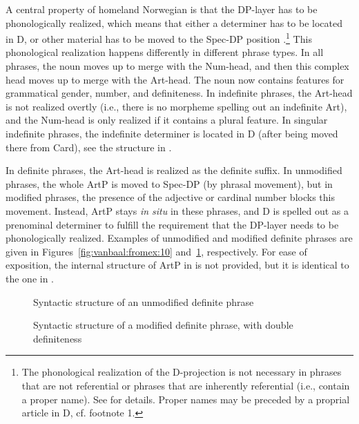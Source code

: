 \documentclass[output=paper]{langscibook}
\begin{document}
A central property of homeland Norwegian is that the DP-layer has to be phonologically realized, which means that either a determiner has to be located in D, or other material has to be moved to the Spec-DP position \citep{Julien2002Determiners,Julien2005}.{\footnote{The phonological realization of the D-projection is not necessary in phrases that are not referential or phrases that are inherently referential (i.e., contain a proper name). See \citet{Julien2002Determiners,Julien2005} for details. Proper names may be preceded by a proprial article in D, cf. footnote 1.}} This phonological realization happens differently in different phrase types. In all phrases, the noun moves up to merge with the Num-head, and then this complex head moves up to merge with the Art-head. The noun now contains features for grammatical gender, number, and definiteness. In indefinite phrases, the Art-head is not realized overtly (i.e., there is no morpheme spelling out an indefinite Art), and the Num-head is only realized if it contains a plural feature. In singular indefinite phrases, the indefinite determiner is located in D (after being moved there from Card), see the structure in .\largerpage[2]

In definite phrases, the Art-head is realized as the definite suffix. In unmodified phrases, the whole ArtP is moved to Spec-DP (by phrasal movement), but in modified phrases, the presence of the adjective or cardinal number blocks this movement. Instead, ArtP stays \textit{in situ} in these phrases, and D is spelled out as a prenominal determiner to fulfill the requirement that the DP-layer needs to be phonologically realized. Examples of unmodified and modified definite phrases are given in Figures~\ref{fig:vanbaal:fromex:10} and~\ref{fig:vanbaal:fromex:11}, respectively. For ease of exposition, the internal structure of ArtP in  is not provided, but it is identical to the one in .


\begin{figure}
\begin{floatrow}
    {%
        \caption{Syntactic structure of an unmodified definite phrase}
        \label{fig:vanbaal:fromex:10}
    }

    {%
        \caption{Syntactic structure of a modified definite phrase, with double definiteness}
        \label{fig:vanbaal:fromex:11}
    }
\end{floatrow}
\end{figure}
\end{document}

